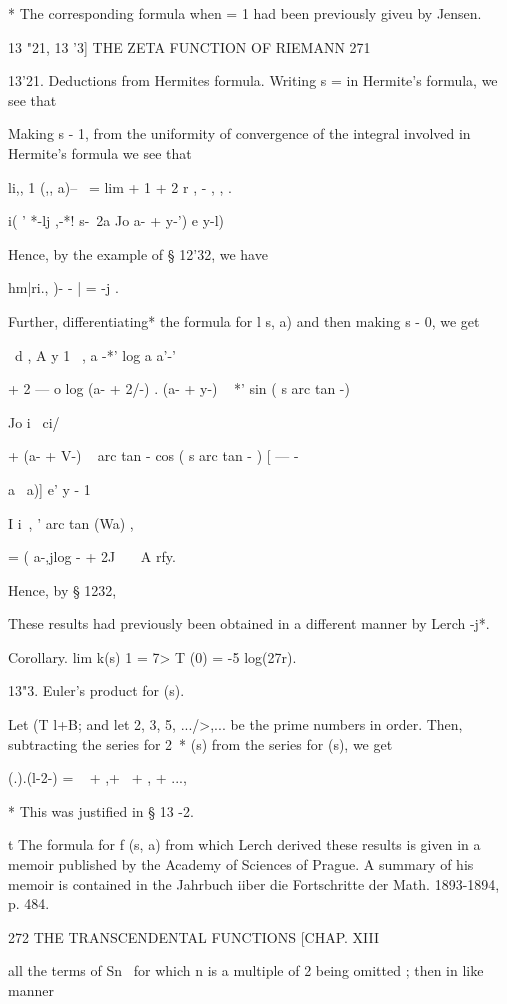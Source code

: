 * The corresponding formula when = 1 had been previously giveu by
Jensen.

13 "21, 13 '3] THE ZETA FUNCTION OF RIEMANN 271

13'21. Deductions from Hermites formula. Writing s = in Hermite's
formula, we see that

Making s - 1, from the uniformity of convergence of the integral
involved in Hermite's formula we see that

li,, 1 (,, a)-- \ = lim + 1 + 2 r , - , , .

  i( ' *-lj ,-*! s-\ 2a Jo a- + y-') e y-l)

Hence, by the example of § 12'32, we have

hm|ri., )- - | = -j .

Further, differentiating* the formula for l s, a) and then making s -
0, we get

\ d , A y 1 \ , a -*' log a a'-'

+ 2 — o log (a- + 2/-) . (a- + y-) ~ *' sin ( s arc tan -)

Jo i \ ci/

+ (a- + V-) ~ arc tan - cos ( s arc tan - ) [ — -

    a \ a)] e' y - 1

I i\ , ' arc tan (Wa) ,

= ( a-,jlog - + 2J \ \ \ A rfy.

Hence, by § 1232,

These results had previously been obtained in a different manner by
Lerch -j*.

Corollary. lim k(s) 1 = 7> T (0) = -5 log(27r).

13"3. Euler's product for (s).

Let (T l+B; and let 2, 3, 5, .../>,... be the prime numbers in order.
Then, subtracting the series for 2~* (s) from the series for (s), we
get

 (.).(l-2-) = ~ + ,+~ + , + ...,

* This was justified in § 13 -2.

t The formula for f (s, a) from which Lerch derived these results is
given in a memoir published by the Academy of Sciences of Prague. A
summary of his memoir is contained in the Jahrbuch iiber die
Fortschritte der Math. 1893-1894, p. 484.

272 THE TRANSCENDENTAL FUNCTIONS [CHAP. XIII

all the terms of Sn~ for which n is a multiple of 2 being omitted ;
then in like manner

